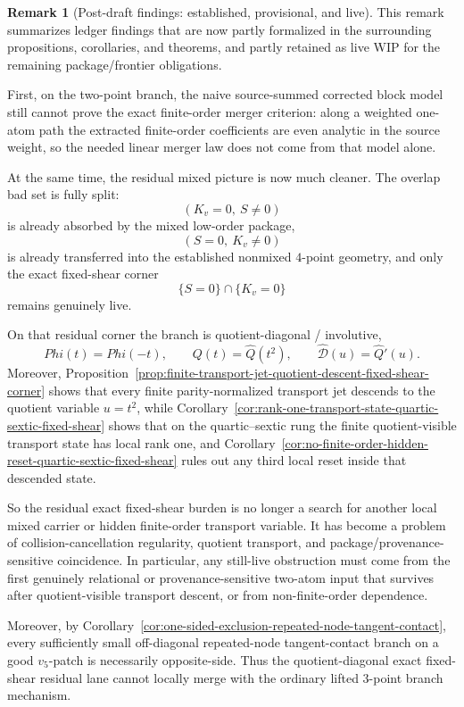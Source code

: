 \documentclass[11pt,a4paper]{amsart}
\def\Phi{Phi}%
\theoremstyle{plain}
\theoremstyle{definition}
\newtheorem{remark}[theorem]{Remark}
\begin{document}
\begin{remark}[Post-draft findings: established, provisional, and live]
\label{rem:post-draft-findings-established-provisional-live}
This remark summarizes ledger findings that are now partly formalized in
the surrounding propositions, corollaries, and theorems, and partly
retained as live WIP for the remaining package/frontier obligations.

First, on the two-point branch, the naive source-summed corrected block model
still cannot prove the exact finite-order merger criterion: along a weighted
one-atom path the extracted finite-order coefficients are even analytic in the
source weight, so the needed linear merger law does not come from that model
alone.

At the same time, the residual mixed picture is now much cleaner. The overlap
bad set is fully split:
\[
(K_v=0,\ S\neq 0)
\]
is already absorbed by the mixed low-order package,
\[
(S=0,\ K_v\neq 0)
\]
is already transferred into the established nonmixed $4$-point geometry,
and only the exact fixed-shear corner
\[
\{S=0\}\cap\{K_v=0\}
\]
remains genuinely live.

On that residual corner the branch is quotient-diagonal / involutive,
\[
\Phi(t)=\Phi(-t),
\qquad
Q(t)=\widehat Q(t^2),
\qquad
\widehat{\mathcal D}(u)=\widehat Q'(u).
\]
Moreover,
Proposition~\ref{prop:finite-transport-jet-quotient-descent-fixed-shear-corner}
shows that every finite parity-normalized transport jet descends to the
quotient variable $u=t^2$, while
Corollary~\ref{cor:rank-one-transport-state-quartic-sextic-fixed-shear}
shows that on the quartic--sextic rung the finite quotient-visible transport
state has local rank one, and
Corollary~\ref{cor:no-finite-order-hidden-reset-quartic-sextic-fixed-shear}
rules out any third local reset inside that descended state.

So the residual exact fixed-shear burden is no longer a search for another
local mixed carrier or hidden finite-order transport variable. It has become a
problem of collision-cancellation regularity, quotient transport, and
package/provenance-sensitive coincidence. In particular, any still-live
obstruction must come from the first genuinely relational or
provenance-sensitive two-atom input that survives after quotient-visible
transport descent, or from non-finite-order dependence.

Moreover, by
Corollary~\ref{cor:one-sided-exclusion-repeated-node-tangent-contact},
every sufficiently small off-diagonal repeated-node tangent-contact branch on a
good $v_5$-patch is necessarily opposite-side. Thus the quotient-diagonal
exact fixed-shear residual lane cannot locally merge with the ordinary lifted
$3$-point branch mechanism.


\end{remark}
\end{document}
